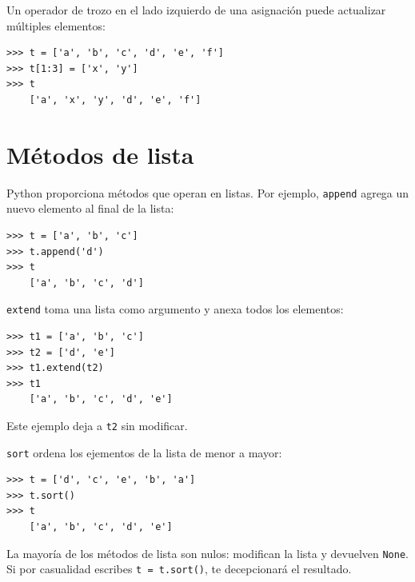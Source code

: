 \documentclass[10pt]{book}
\begin{document}
Un operador de trozo en el lado izquierdo de una asignación
puede actualizar múltiples elementos:

\begin{verbatim}
>>> t = ['a', 'b', 'c', 'd', 'e', 'f']
>>> t[1:3] = ['x', 'y']
>>> t
    ['a', 'x', 'y', 'd', 'e', 'f']
\end{verbatim}
%


%

%


\section{Métodos de lista}

Python proporciona métodos que operan en listas.  Por ejemplo,
{\tt append} agrega un nuevo elemento al final de la lista:

\begin{verbatim}
>>> t = ['a', 'b', 'c']
>>> t.append('d')
>>> t
    ['a', 'b', 'c', 'd']
\end{verbatim}
%
{\tt extend} toma una lista como argumento y anexa todos
los elementos:

\begin{verbatim}
>>> t1 = ['a', 'b', 'c']
>>> t2 = ['d', 'e']
>>> t1.extend(t2)
>>> t1
    ['a', 'b', 'c', 'd', 'e']
\end{verbatim}
%
Este ejemplo deja a {\tt t2} sin modificar.

{\tt sort} ordena los ejementos de la lista de menor a mayor:

\begin{verbatim}
>>> t = ['d', 'c', 'e', 'b', 'a']
>>> t.sort()
>>> t
    ['a', 'b', 'c', 'd', 'e']
\end{verbatim}
%
La mayoría de los métodos de lista son nulos: modifican la lista y devuelven {\tt None}.
Si por casualidad escribes {\tt t = t.sort()}, te decepcionará
el resultado.
\end{document}
